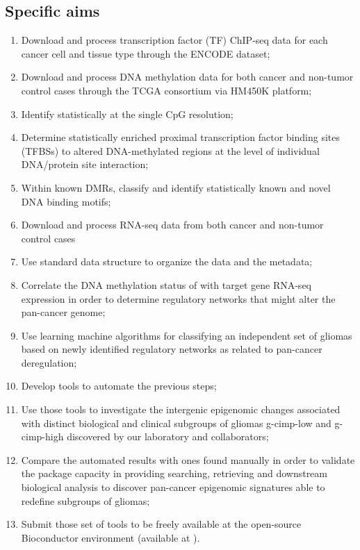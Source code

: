 \subsection{Specific aims}
\begin{enumerate}
    \item Download and process transcription factor (TF) ChIP-seq data for each cancer cell and tissue type through the ENCODE dataset;
    \item Download and process DNA methylation data for both cancer and non-tumor control cases through the TCGA consortium via HM450K platform;
    \item Identify statistically  at the single CpG resolution;
    \item Determine statistically enriched proximal transcription factor binding sites (TFBSs) to altered DNA-methylated regions at the level of individual DNA/protein site interaction;
    \item Within known DMRs, classify and identify statistically known and novel DNA binding motifs;
    \item Download and process RNA-seq data from both cancer and non-tumor control cases
    \item Use standard data structure to organize the data and the metadata;
    \item Correlate the DNA methylation status of  with target gene RNA-seq expression in order to determine regulatory networks that might alter the pan-cancer genome;
    \item Use learning machine algorithms for classifying an independent set of gliomas based on newly identified regulatory networks as related to pan-cancer deregulation;
    \item Develop tools to automate the previous steps;
    \item Use those tools to investigate the intergenic epigenomic changes associated with distinct biological and clinical subgroups of gliomas g-cimp-low and g-cimp-high discovered by our laboratory and collaborators;
    \item Compare the automated results with ones found manually in order to validate the package capacity in providing searching, retrieving and downstream biological analysis to discover pan-cancer epigenomic signatures able to redefine subgroups of gliomas;
    \item Submit those set of tools to be freely available at the open-source Bioconductor environment (available at ).
\end{enumerate}

